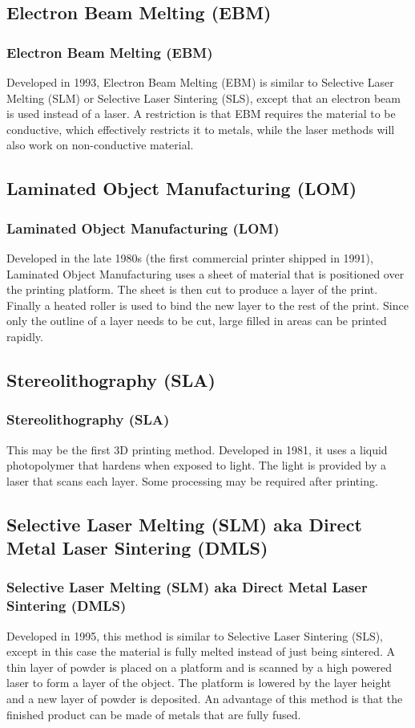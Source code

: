 \documentclass[english,10pt]{beamer}
\begin{document}
\subsection{Electron Beam Melting (EBM)}
\begin{frame}
  \frametitle{Electron Beam Melting (EBM)}
  Developed in 1993, Electron Beam Melting (EBM) is similar to Selective Laser Melting (SLM) or Selective Laser Sintering (SLS), except that an electron beam is used instead of a laser.  A restriction is that EBM requires the material to be conductive, which effectively restricts it to metals, while the laser methods will also work on non-conductive material.
\end{frame}

\subsection{Laminated Object Manufacturing (LOM)}
\begin{frame}
  \frametitle{Laminated Object Manufacturing (LOM)}
  Developed in the late 1980s (the first commercial printer shipped in 1991), Laminated Object Manufacturing uses a sheet of material that is positioned over the printing platform.  The sheet is then cut to produce a layer of the print.  Finally a heated roller is used to bind the new layer to the rest of the print.  Since only the outline of a layer needs to be cut, large filled in areas can be printed rapidly.
\end{frame}

\subsection{Stereolithography (SLA)}
\begin{frame}
  \frametitle{Stereolithography (SLA)}
  This may be the first 3D printing method.  Developed in 1981, it uses a liquid photopolymer that hardens when exposed to light.  The light is provided by a laser that scans each layer.  Some processing may be required after printing.
\end{frame}

\subsection{Selective Laser Melting (SLM) aka Direct Metal Laser Sintering (DMLS)}
\begin{frame}
  \frametitle{Selective Laser Melting (SLM) aka Direct Metal Laser Sintering (DMLS)}
  Developed in 1995, this method is similar to Selective Laser Sintering (SLS), except in this case the material is fully melted instead of just being sintered.    A thin layer of powder is placed on a platform and is scanned by a high powered laser to form a layer of the object.  The platform is lowered by the layer height and a new layer of powder is deposited.  An advantage of this method is that the finished product can be made of metals that are fully fused.
\end{frame}
\end{document}
